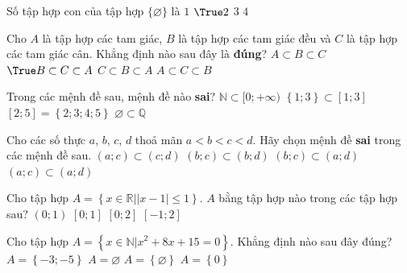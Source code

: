 \begin{ex}%
	Số tập hợp con của tập hợp  $ \{\varnothing\} $ là
	\choice 
		{$  1 $}
		{$ \True 2  $}
		{$ 3 $} 
		 {$ 4 $}
\end{ex}

\begin{ex}%
	Cho $A$ là tập hợp  các tam giác, $B$ là tập hợp các tam giác đều và $C$ là tập hợp các tam giác cân. Khẳng định nào sau đây là \textbf{đúng}?
	\choice 
		{$ A \subset B  \subset C $}
		{$ \True B \subset C  \subset A $}
		{$  C \subset B \subset A $}
		{$ A \subset C \subset  B $}
\end{ex}

\begin{ex}%
	Trong các mệnh  đề sau, mệnh đề nào \textbf{sai}?
	\choice 
		 {$\mathbb{N}\subset [0;+\infty)$}
		{$\left\{1;  3\right\}\subset [1; 3]$}
		{\True $[2; 5]=\left\{2; 3;  4; 5\right\}$}
		{$\varnothing \subset \mathbb{Q}$} 
\end{ex}

\begin{ex}%
	Cho các số thực $a$, $ b$, $ c$, $ d$ thoả  mãn $a<b<c<d$. Hãy chọn mệnh đề \textbf{sai} trong các mệnh đề sau.
	 \choice
		{\True $(a;c)\subset (c;d)$} 
		 {$(b;c)\subset (b;d)$}
		{$(b;c)\subset  (a;d)$}
		{$(a;c)\subset (a;d)$} 
\end{ex}

\begin{ex}%
	Cho tập hợp $A=\left\{x\in \mathbb{R}\big||x-1|\leq 1 \right\}$.  $A$ bằng tập hợp nào trong các tập hợp sau?
	\choice 
		{$(0;1)$} 
		{$[0;1]$} 
		 {\True $[0; 2]$}
		 {$[-1;2]$}
\end{ex}

\begin{ex}%
	Cho tập  hợp $A = \left\{x \in \mathbb{N}\big| x^2 + 8x + 15 = 0\right\}$. Khẳng định nào sau đây đúng?
	 \choice
		 {$A = \left\{-3;-5\right\}$}
		{\True $A  =\varnothing$}
		{$A  = \left\{\varnothing\right\}$}
		{$A  = \left\{0\right\}$}
\end{ex}

